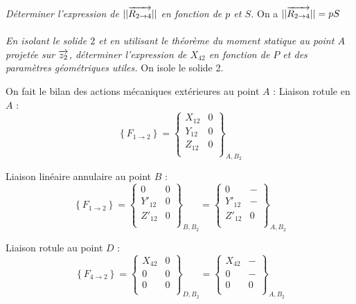 \documentclass[10pt,oneside]{article}
\begin{document}
\paragraph{}
\textit{Déterminer l'expression de $||\overrightarrow{R_{2\rightarrow 4}}||$ en fonction de $p$ et $S$.}
On a $||\overrightarrow{R_{2\rightarrow 4}}||=pS$ 

\paragraph{}
\textit{En isolant le solide $2$ et en utilisant le théorème du moment statique au point $A$ projetée sur $\overrightarrow{z_2}$, déterminer l'expression de $X_{42}$ en fonction de $P$ et des paramètres géométriques utiles.}
On isole le solide 2. 

On fait le bilan des actions mécaniques extérieures au point $A$ :
Liaison rotule en $A$ : 
$$
\left\{
F_{1 \rightarrow 2} 
\right\}=
\left\{
\begin{array}{cc}
X_{12} & 0 \\
Y_{12} & 0 \\
Z_{12} & 0 \\
\end{array}
\right\}_{A,B_2}
$$



Liaison linéaire annulaire au point $B$ :
$$
\left\{
F_{1 \rightarrow 2} 
\right\}=
\left\{
\begin{array}{cc}
0 & 0 \\
Y'_{12} & 0 \\
Z'_{12} & 0 \\
\end{array}
\right\}_{B,B_2}
=
\left\{
\begin{array}{cc}
0 &  -\\
Y'_{12} &  -\\
Z'_{12} &  0\\
\end{array}
\right\}_{A,B_2}
$$


Liaison rotule au point $D$ :
$$
\left\{
F_{4 \rightarrow 2} 
\right\}
=
\left\{
\begin{array}{cc}
X_{42}  & 0 \\
0 & 0 \\
0 & 0 \\
\end{array}
\right\}_{D,B_2}
=
\left\{
\begin{array}{cc}
X_{42}  & -\\
0 & -\\
0 & 0 \\
\end{array}
\right\}_{A,B_2}
$$
\end{document}
